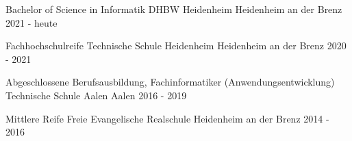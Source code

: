 
\begin{cventries}
  \cventry
  {Bachelor of Science in Informatik} %
  {DHBW Heidenheim} %
  {Heidenheim an der Brenz} %
  {2021 - heute} %
  {
  }

  \cventry
  {Fachhochschulreife} %
  {Technische Schule Heidenheim} %
  {Heidenheim an der Brenz} %
  {2020 - 2021} %
  {
  }

  \cventry
  {Abgeschlossene Berufsausbildung, Fachinformatiker (Anwendungsentwicklung)} %
  {Technische Schule Aalen} %
  {Aalen} %
  {2016 - 2019} %
  {
  }

  \cventry
  {Mittlere Reife} %
  {Freie Evangelische Realschule} %
  {Heidenheim an der Brenz} %
  {2014 - 2016} %
  {
  }
\end{cventries}
